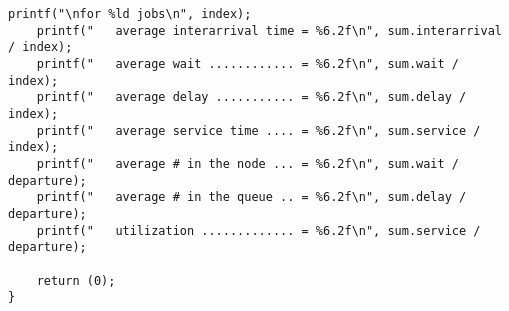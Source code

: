 \begin{lstlisting}[style=CStyle]
    printf("\nfor %ld jobs\n", index);
    printf("   average interarrival time = %6.2f\n", sum.interarrival / index);
    printf("   average wait ............ = %6.2f\n", sum.wait / index);
    printf("   average delay ........... = %6.2f\n", sum.delay / index);
    printf("   average service time .... = %6.2f\n", sum.service / index);
    printf("   average # in the node ... = %6.2f\n", sum.wait / departure);
    printf("   average # in the queue .. = %6.2f\n", sum.delay / departure);
    printf("   utilization ............. = %6.2f\n", sum.service / departure);

    return (0);
}

\end{lstlisting}